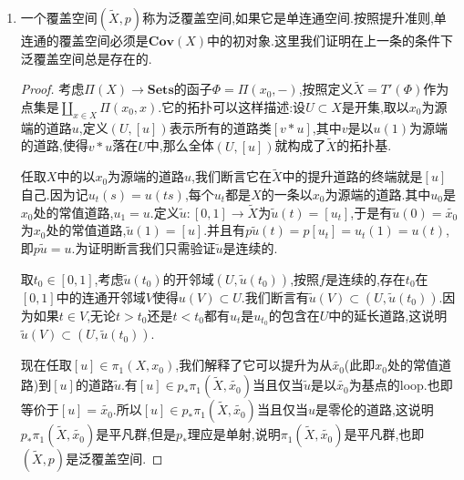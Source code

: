\begin{enumerate}
\begin{proof}
\begin{enumerate}
			按照如下两个交换图表,说明$\alpha$视为$U\times\Phi_1(x_0)\to U\times\Phi_2(x_0)$的映射是$(x,y)\mapsto(x,\alpha(x_0)(y))$,按照$\Phi_i(x)$上总赋予离散拓扑,这就是连续映射.
			$$\xymatrix{U\times\Phi_1(x_0)\ar[rr]^{\alpha}\ar@{=}[d]&&U\times\Phi_2(x_0)\ar@{=}[d]\\p_1^{-1}(U)\ar[rr]^{\alpha}&&p_2^{-1}(U)}$$
			$$\xymatrix{\Phi_1(x_0)\ar[rr]^{\alpha}\ar[d]_{\Phi_1(w)}&&\Phi_2(x_0)\ar[d]^{\Phi_1(w)}\\\Phi_1(x)\ar[rr]^{\alpha}&&\Phi_2(x)}$$
			\item 最后验证$T,T'$互为拟逆函子.
		\end{enumerate}
	\end{proof}
	\item 一个覆盖空间$(\widetilde{X},p)$称为泛覆盖空间,如果它是单连通空间.按照提升准则,单连通的覆盖空间必须是$\textbf{Cov}(X)$中的初对象.这里我们证明在上一条的条件下泛覆盖空间总是存在的.
	\begin{proof}
		
		考虑$\Pi(X)\to\textbf{Sets}$的函子$\Phi=\Pi(x_0,-)$,按照定义$\widetilde{X}=T'(\Phi)$作为点集是$\coprod_{x\in X}\Pi(x_0,x)$.它的拓扑可以这样描述:设$U\subset X$是开集,取以$x_0$为源端的道路$u$,定义$(U,[u])$表示所有的道路类$[v\ast u]$,其中$v$是以$u(1)$为源端的道路,使得$v\ast u$落在$U$中,那么全体$(U,[u])$就构成了$\widetilde{X}$的拓扑基.
		
		\qquad
		
		任取$X$中的以$x_0$为源端的道路$u$,我们断言它在$\widetilde{X}$中的提升道路的终端就是$[u]$自己.因为记$u_t(s)=u(ts)$,每个$u_t$都是$X$的一条以$x_0$为源端的道路.其中$u_0$是$x_0$处的常值道路,$u_1=u$.定义$\widetilde{u}:[0,1]\to\widetilde{X}$为$\widetilde{u}(t)=[u_t]$,于是有$\widetilde{u}(0)=\widetilde{x_0}$为$x_0$处的常值道路,$\widetilde{u}(1)=[u]$.并且有$p\widetilde{u}(t)=p[u_t]=u_t(1)=u(t)$,即$p\widetilde{u}=u$.为证明断言我们只需验证$\widetilde{u}$是连续的.
		
		\qquad
		
		取$t_0\in[0,1]$,考虑$\widetilde{u}(t_0)$的开邻域$(U,\widetilde{u}(t_0))$,按照$f$是连续的,存在$t_0$在$[0,1]$中的连通开邻域$V$使得$u(V)\subset U$.我们断言有$\widetilde{u}(V)\subset(U,\widetilde{u}(t_0))$.因为如果$t\in V$,无论$t>t_0$还是$t<t_0$都有$u_t$是$u_{t_0}$的包含在$U$中的延长道路,这说明$\widetilde{u}(V)\subset(U,\widetilde{u}(t_0))$.
		
		\qquad
		
		现在任取$[u]\in\pi_1(X,x_0)$,我们解释了它可以提升为从$\widetilde{x_0}$(此即$x_0$处的常值道路)到$[u]$的道路$\widetilde{u}$.有$[u]\in p_*\pi_1(\widetilde{X},\widetilde{x_0})$当且仅当$\widetilde{u}$是以$\widetilde{x_0}$为基点的loop.也即等价于$[u]=\widetilde{x_0}$.所以$[u]\in p_*\pi_1(\widetilde{X},\widetilde{x_0})$当且仅当$u$是零伦的道路,这说明$p_*\pi_1(\widetilde{X},\widetilde{x_0})$是平凡群,但是$p_*$理应是单射,说明$\pi_1(\widetilde{X},\widetilde{x_0})$是平凡群,也即$(\widetilde{X},p)$是泛覆盖空间.
	\end{proof}
\end{enumerate}

